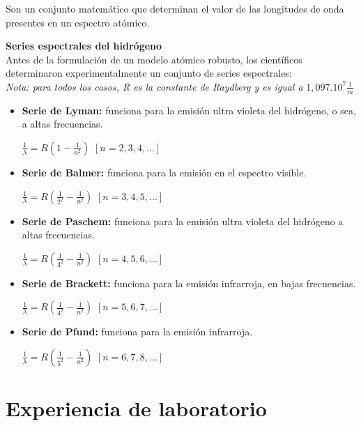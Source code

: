 \documentclass[a4paper]{article}
\begin{document}
        \indent Son un conjunto matemático que determinan el valor de las longitudes de onda presentes en un espectro atómico.

        \textbf{Series espectrales del hidrógeno} \\
            Antes de la formulación de un modelo atómico robusto, los científicos determinaron experimentalmente un conjunto de series espectrales: \\

            \textit{Nota: para todos los casos, R es la constante de Raydberg y es igual a} $1,097 . 10^7 \frac{1}{m}$ \\

            \begin{itemize}
                \item \textbf{Serie de Lyman:} funciona para la emisión ultra violeta del hidrógeno, o sea, a altas frecuencias. 
                    \begin{center}
                        $\frac {1}{\lambda} = R(1 - {\frac{1}{n^2}})$ \hspace{2mm} $[n = 2,3,4,...]$
                    \end{center}

                \item \textbf{Serie de Balmer:} funciona para la emisión en el espectro visible.
                    \begin{center}
                        $\frac {1}{\lambda} = R({\frac{1}{2^2}} - {\frac{1}{n^2}})$ \hspace{2mm} $[n = 3,4,5,...]$
                    \end{center}

                \item \textbf{Serie de Paschem:} funciona para la emisión ultra violeta del hidrógeno a altas frecuencias.
                    \begin{center}
                        $\frac {1}{\lambda} = R({\frac{1}{3^2}} - {\frac{1}{n^2}})$ \hspace{2mm} $[n = 4,5,6,...]$
                    \end{center}

                \item \textbf{Serie de Brackett:} funciona para la emisión infrarroja, en bajas frecuencias.
                    \begin{center}
                        $\frac {1}{\lambda} = R({\frac{1}{4^2}} - {\frac{1}{n^2}})$ \hspace{2mm} $[n = 5,6,7,...]$
                    \end{center}

                \item \textbf{Serie de Pfund:} funciona para la emisión infrarroja.
                    \begin{center}
                        $\frac {1}{\lambda} = R({\frac{1}{5^2}} - {\frac{1}{n^2}})$ \hspace{2mm} $[n = 6,7,8,...]$
                    \end{center}
            \end{itemize}
        
\section{Experiencia de laboratorio}
\end{document}
